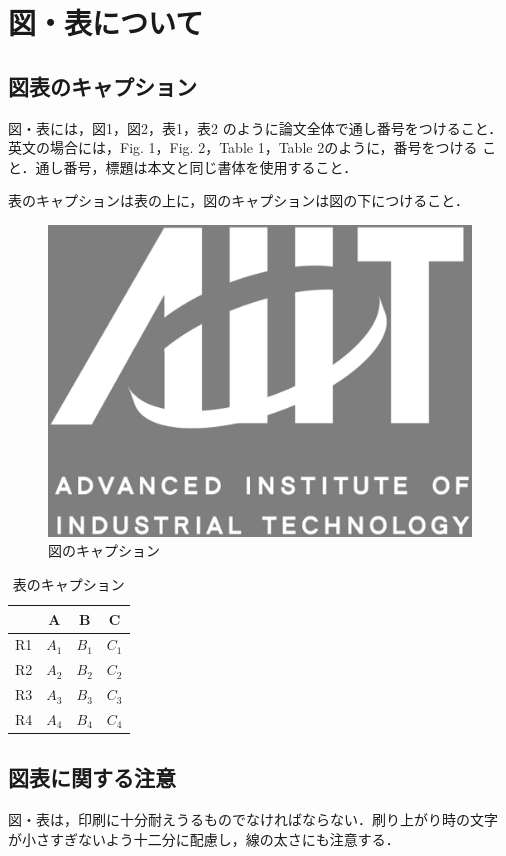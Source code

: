 \documentclass[a4j, 12Q, twocolumn, twoside]{jsarticle}
\begin{document}
\section{図・表について}
\subsection{図表のキャプション}
図・表には，図1，図2，表1，表2 のように論文全体で通し番号をつけること．
英文の場合には，Fig. 1，Fig. 2，Table 1，Table 2のように，番号をつける
こと．通し番号，標題は本文と同じ書体を使用すること．

表のキャプションは表の上に，図のキャプションは図の下につけること．

\begin{figure}
 \begin{center}
  \includegraphics[width=0.5\linewidth]{aiit_symbol.eps}
 \end{center}
 \caption{図のキャプション}
 \label{fig:one}
 \vskip 0pt %
\end{figure}

\begin{table}
 \caption{表のキャプション}
 \begin{center}
  \begin{tabular}{c|ccc} \hline \hline
   & A & B & C \\ \hline
   R1 & $A_{1}$ & $B_{1}$ & $C_{1}$ \\
   R2 & $A_{2}$ & $B_{2}$ & $C_{2}$ \\
   R3 & $A_{3}$ & $B_{3}$ & $C_{3}$ \\
   R4 & $A_{4}$ & $B_{4}$ & $C_{4}$ \\ \hline
  \end{tabular}
 \end{center}
 \vskip -3pt %
\end{table}

\subsection{図表に関する注意}
図・表は，印刷に十分耐えうるものでなければならない．刷り上がり時の文字
が小さすぎないよう十二分に配慮し，線の太さにも注意する．
\end{document}
